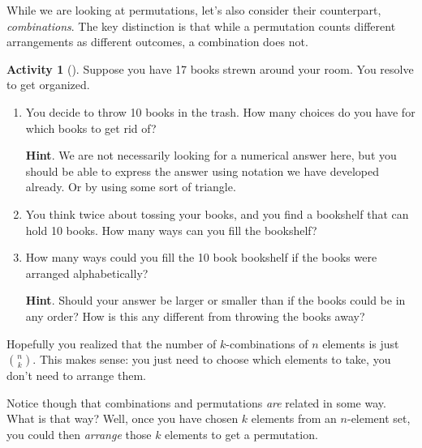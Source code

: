 \documentclass[10pt,]{book}
\theoremstyle{plain}
\theoremstyle{definition}
\theoremstyle{definition}
\theoremstyle{definition}
\newtheorem{activity}[project]{Activity}
\theoremstyle{definition}
\numberwithin{equation}{chapter}
\begin{document}
%
\par
\hypertarget{p-563}{}%
While we are looking at permutations, let's also consider their counterpart, \emph{combinations}. The key distinction is that while a permutation counts different arrangements as different outcomes, a combination does not.%
\begin{activity}[]\label{activity-34}
\hypertarget{p-564}{}%
Suppose you have 17 books strewn around your room.  You resolve to get organized.%
\begin{enumerate}[font=\bfseries,label=(\alph*),ref=\alph*]
\item\label{task-64} \hypertarget{p-565}{}%
You decide to throw 10 books in the trash.  How many choices do you have for which books to get rid of?%
\par\smallskip%
\noindent\textbf{Hint}.\hypertarget{hint-22}{}\quad%
\hypertarget{p-566}{}%
We are not necessarily looking for a numerical answer here, but you should be able to express the answer using notation we have developed already.  Or by using some sort of triangle.%
\item\label{task-65} \hypertarget{p-567}{}%
You think twice about tossing your books, and you find a bookshelf that can hold 10 books.  How many ways can you fill the bookshelf?%
\item\label{task-66} \hypertarget{p-568}{}%
How many ways could you fill the 10 book bookshelf if the books were arranged alphabetically?%
\par\smallskip%
\noindent\textbf{Hint}.\hypertarget{hint-23}{}\quad%
\hypertarget{p-569}{}%
Should your answer be larger or smaller than if the books could be in any order?  How is this any different from throwing the books away?%
\end{enumerate}
\end{activity}
\hypertarget{p-570}{}%
Hopefully you realized that the number of \(k\)-combinations of \(n\) elements is just \(\binom{n}{k}\).  This makes sense: you just need to choose which elements to take, you don't need to arrange them.%
\par
\hypertarget{p-571}{}%
Notice though that combinations and permutations \emph{are} related in some way.  What is that way?  Well, once you have chosen \(k\) elements from an \(n\)-element set, you could then \emph{arrange} those \(k\) elements to get a permutation.%
\end{document}
